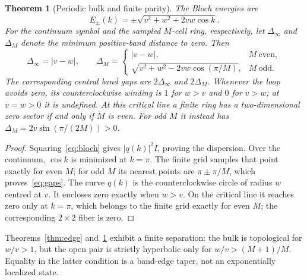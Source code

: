 \documentclass[10pt]{article}
\newtheorem{theorem}{Theorem}
\begin{document}
\begin{theorem}[Periodic bulk and finite parity]\label{thm:bulk}
The Bloch energies are
\begin{equation}\label{eq:dispersion}
 E_\pm(k)=\pm\sqrt{v^2+w^2+2vw\cos k}.
\end{equation}
For the continuum symbol and the sampled $M$-cell ring, respectively, let
$\Delta_\infty$ and $\Delta_M$ denote the minimum positive-band distance
to zero.  Then
\begin{equation}\label{eq:gaps}
 \Delta_\infty=|v-w|,\qquad
 \Delta_M=
 \begin{cases}
 |v-w|,&M\ \text{even},\\
 \sqrt{v^2+w^2-2vw\cos(\pi/M)},&M\ \text{odd}.
 \end{cases}
\end{equation}
The corresponding central band gaps are $2\Delta_\infty$ and $2\Delta_M$.
Whenever the loop avoids zero, its counterclockwise winding is
$1$ for $w>v$ and $0$ for $v>w$; at $v=w>0$ it is undefined.  At this
critical line a finite ring has a two-dimensional zero sector if and only if
$M$ is even.  For odd $M$ it instead has
$\Delta_M=2v\sin(\pi/(2M))>0$.
\end{theorem}
\begin{proof}
Squaring~\eqref{eq:bloch} gives $|q(k)|^2I$, proving the dispersion.
Over the continuum, $\cos k$ is minimized at $k=\pi$.  The finite grid
samples that point exactly for even $M$; for odd $M$ its nearest points are
$\pi\pm\pi/M$, which proves~\eqref{eq:gaps}.
The curve $q(k)$ is the counterclockwise circle of radius $w$ centred at
$v$.  It encloses zero exactly when $w>v$.  On the critical line it reaches
zero only at $k=\pi$, which belongs to the finite grid exactly for even $M$;
the corresponding $2\times2$ fiber is zero.
\end{proof}

Theorems~\ref{thm:edge} and~\ref{thm:bulk} exhibit a finite separation:
the bulk is topological for $w/v>1$, but the open pair is strictly
hyperbolic only for $w/v>(M+1)/M$.  Equality in the latter condition is a
band-edge taper, not an exponentially localized state.
\end{document}
